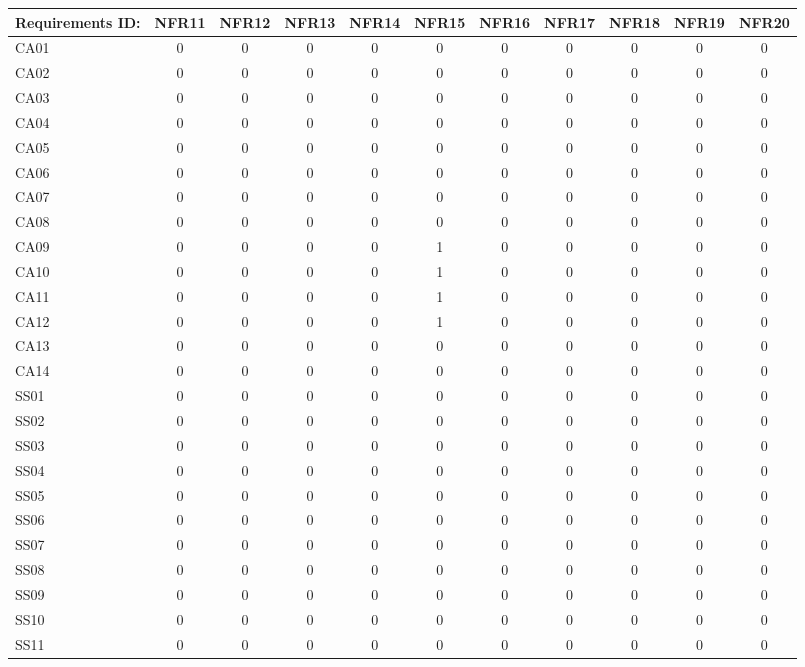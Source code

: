\documentclass [10pt]{article}
\begin{document}
\begin{longtable}{ | p{}  | c | c | c | c | c | c | c | c | c | c | }
\hline
	Requirements ID: & NFR11 & NFR12 & NFR13 & NFR14 & NFR15 & NFR16 & NFR17 & NFR18 & NFR19 & NFR20 \\ \hline
	CA01 & 0 & 0 & 0 & 0 & 0 & 0 & 0 & 0 & 0 & 0 \\ \hline
	CA02 & 0 & 0 & 0 & 0 & 0 & 0 & 0 & 0 & 0 & 0 \\ \hline
	CA03 & 0 & 0 & 0 & 0 & 0 & 0 & 0 & 0 & 0 & 0 \\ \hline
	CA04 & 0 & 0 & 0 & 0 & 0 & 0 & 0 & 0 & 0 & 0 \\ \hline
	CA05 & 0 & 0 & 0 & 0 & 0 & 0 & 0 & 0 & 0 & 0 \\ \hline
	CA06 & 0 & 0 & 0 & 0 & 0 & 0 & 0 & 0 & 0 & 0 \\ \hline
	CA07 & 0 & 0 & 0 & 0 & 0 & 0 & 0 & 0 & 0 & 0 \\ \hline
	CA08 & 0 & 0 & 0 & 0 & 0 & 0 & 0 & 0 & 0 & 0 \\ \hline
	CA09 & 0 & 0 & 0 & 0 & 1 & 0 & 0 & 0 & 0 & 0 \\ \hline
	CA10 & 0 & 0 & 0 & 0 & 1 & 0 & 0 & 0 & 0 & 0 \\ \hline
	CA11 & 0 & 0 & 0 & 0 & 1 & 0 & 0 & 0 & 0 & 0 \\ \hline
	CA12 & 0 & 0 & 0 & 0 & 1 & 0 & 0 & 0 & 0 & 0 \\ \hline
	CA13 & 0 & 0 & 0 & 0 & 0 & 0 & 0 & 0 & 0 & 0 \\ \hline
	CA14 & 0 & 0 & 0 & 0 & 0 & 0 & 0 & 0 & 0 & 0 \\ \hline
	SS01 & 0 & 0 & 0 & 0 & 0 & 0 & 0 & 0 & 0 & 0 \\ \hline
	SS02 & 0 & 0 & 0 & 0 & 0 & 0 & 0 & 0 & 0 & 0 \\ \hline
	SS03 & 0 & 0 & 0 & 0 & 0 & 0 & 0 & 0 & 0 & 0 \\ \hline
	SS04 & 0 & 0 & 0 & 0 & 0 & 0 & 0 & 0 & 0 & 0 \\ \hline
	SS05 & 0 & 0 & 0 & 0 & 0 & 0 & 0 & 0 & 0 & 0 \\ \hline
	SS06 & 0 & 0 & 0 & 0 & 0 & 0 & 0 & 0 & 0 & 0 \\ \hline
	SS07 & 0 & 0 & 0 & 0 & 0 & 0 & 0 & 0 & 0 & 0 \\ \hline
	SS08 & 0 & 0 & 0 & 0 & 0 & 0 & 0 & 0 & 0 & 0 \\ \hline
	SS09 & 0 & 0 & 0 & 0 & 0 & 0 & 0 & 0 & 0 & 0 \\ \hline
	SS10 & 0 & 0 & 0 & 0 & 0 & 0 & 0 & 0 & 0 & 0 \\ \hline
	SS11 & 0 & 0 & 0 & 0 & 0 & 0 & 0 & 0 & 0 & 0 \\ \hline

\end{longtable}
\end{document}
